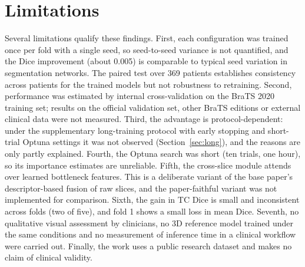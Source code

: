 \section{Limitations}\label{sec:limits}
Several limitations qualify these findings. First, each configuration was trained once per fold with a single seed, so seed-to-seed variance is not quantified, and the Dice improvement (about 0.005) is comparable to typical seed variation in segmentation networks. The paired test over 369 patients establishes consistency across patients for the trained models but not robustness to retraining. Second, performance was estimated by internal cross-validation on the BraTS 2020 training set; results on the official validation set, other BraTS editions or external clinical data were not measured. Third, the advantage is protocol-dependent: under the supplementary long-training protocol with early stopping and short-trial Optuna settings it was not observed (Section~\ref{sec:long}), and the reasons are only partly explained. Fourth, the Optuna search was short (ten trials, one hour), so its importance estimates are unreliable. Fifth, the cross-slice module attends over learned bottleneck features. This is a deliberate variant of the base paper's descriptor-based fusion of raw slices, and the paper-faithful variant was not implemented for comparison. Sixth, the gain in TC Dice is small and inconsistent across folds (two of five), and fold 1 shows a small loss in mean Dice. Seventh, no qualitative visual assessment by clinicians, no 3D reference model trained under the same conditions and no measurement of inference time in a clinical workflow were carried out. Finally, the work uses a public research dataset and makes no claim of clinical validity.
